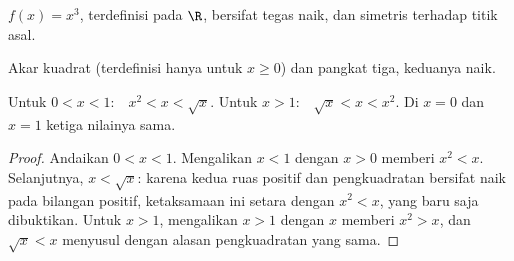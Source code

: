 \begin{proposition}\label{prop:g10:reffunc:cube}
 $f(x) = x^3$, terdefinisi pada $\R$, bersifat tegas naik, dan
 simetris terhadap titik asal.
\end{proposition}
\admitted

\begin{omfigure}
\hfill
{}

{\small Akar kuadrat (terdefinisi hanya untuk $x \geq 0$) dan pangkat tiga,
keduanya naik.}
\end{omfigure}

\begin{proposition}\label{prop:g10:reffunc:compare}
Untuk $0 < x < 1$:\ \ $x^2 < x < \sqrt x$.\quad
Untuk $x > 1$:\ \ $\sqrt x < x < x^2$.\quad
Di $x = 0$ dan $x = 1$ ketiga nilainya sama.
\end{proposition}

\begin{proof}
Andaikan $0 < x < 1$. Mengalikan $x < 1$ dengan $x > 0$ memberi $x^2 < x$.
Selanjutnya, $x < \sqrt x$: karena kedua ruas positif dan pengkuadratan
bersifat naik pada bilangan positif, ketaksamaan ini setara dengan
$x^2 < x$, yang baru saja dibuktikan. Untuk $x > 1$, mengalikan $x > 1$ dengan
$x$ memberi $x^2 > x$, dan $\sqrt x < x$ menyusul dengan alasan pengkuadratan yang sama.
\end{proof}

